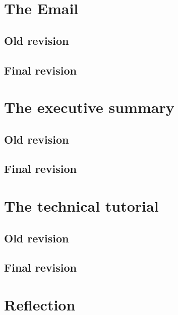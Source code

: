 \documentclass[11pt,english]{article}
\begin{document}
	\newpage
	\tableofcontents

	\newpage
	\section{The Email}
	\subsection{Old revision}
	

	\newpage
	\subsection{Final revision}
	

	\newpage
	\section{The executive summary}
	\subsection{Old revision}
	

	\newpage
	\subsection{Final revision}
	

	\newpage
	\section{The technical tutorial}
	\subsection{Old revision}
	

	\newpage
	\subsection{Final revision}
	

	\newpage
	\section{Reflection}
\end{document}
